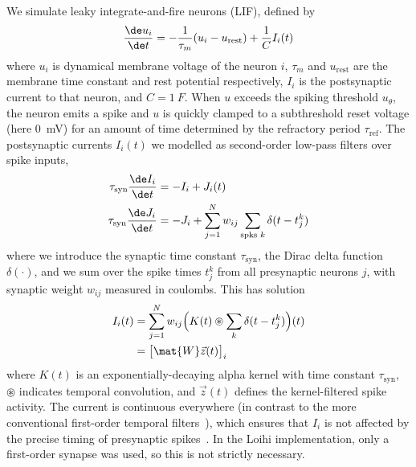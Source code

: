 We simulate leaky integrate-and-fire neurons (LIF), defined by
\begin{equation}
\label{eqn:LIF}
\frac{\de u_i}{\de t} = -\frac{1}{\tau_m}(u_i - u_\text{rest}) + \frac{1}{C} I_i(t)
\end{equation}
where $u_i$ is dynamical membrane voltage of the neuron $i$, $\tau_m$ and $u_\text{rest}$ are the membrane time constant and rest potential respectively, $I_i$ is the postsynaptic current to that neuron, and $C = \qty{1}{F}$. When $u$ exceeds the spiking threshold $u_\theta$, the neuron emits a spike and $u$ is quickly clamped to a subthreshold reset voltage (here \qty{0}{mV}) for an amount of time determined by the refractory period $\tau_{\text{ref}}$.
The postsynaptic currents $I_i(t)$ we modelled as second-order low-pass filters over spike inputs,
\begin{equation}
\label{eqn:alpha_PSP}
\begin{split}
    \tau_\text{syn} \frac{\de I_i}{\de t} &= - I_i + J_i(t) \\
    \tau_\text{syn} \frac{\de J_i}{\de t} & = - J_i + \sum_{j =1}^{N} w_{ij} \sum_{\text{spks }k} \delta(t - t_j^k)
\end{split}
\end{equation}
where we introduce the synaptic time constant $\tau_\text{syn}$, the Dirac delta function $\delta(\cdot)$, and we sum over the spike times $t_j^k$ from all presynaptic neurons $j$, with synaptic weight $w_{ij}$ measured in coulombs.
This has solution
\begin{equation}
\begin{split}
I_i(t) & = \sum_{j=1}^N w_{ij} \Big( K(t) \circledast \sum_k \delta(t - t^k_j) \Big) (t) \\
& = \big[ \mat{W} \vec{z}(t) \big]_i
\end{split}
\label{eqn:sim_current_soln}
\end{equation}
where $K(t)$ is an exponentially-decaying alpha kernel with time constant $\tau_\text{syn}$, $\circledast$ indicates temporal convolution, and $\vec{z}(t)$ defines the kernel-filtered spike activity.
The current is continuous everywhere (in contrast to the more conventional first-order temporal filters~\cite{chicca_neuromorphic_2014}), which ensures that $I_i$ is not affected by the precise timing of presynaptic spikes~\cite{richter_subthreshold_2023}.
In the Loihi implementation, only a first-order synapse was used, so this is not strictly necessary.

